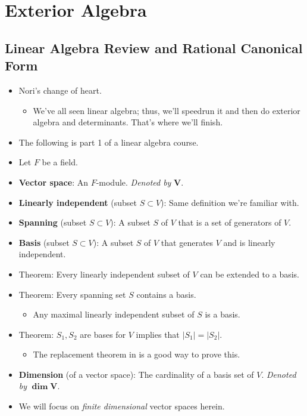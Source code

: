 \documentclass[../notes.tex]{subfiles}
\begin{document}
\chapter{Exterior Algebra}
\section{Linear Algebra Review and Rational Canonical Form}
\begin{itemize}
    \item {}Nori's change of heart.
    \begin{itemize}
        \item We've all seen linear algebra; thus, we'll speedrun it and then do exterior algebra and determinants. That's where we'll finish.
    \end{itemize}
    \item The following is part 1 of a linear algebra course.
    \item Let $F$ be a field.
    \item \textbf{Vector space}: An $F$-module. \emph{Denoted by} $\bm{V}$.
    \item \textbf{Linearly independent} (subset $S\subset V$): Same definition we're familiar with.
    \item \textbf{Spanning} (subset $S\subset V$): A subset $S$ of $V$ that is a set of generators of $V$.
    \item \textbf{Basis} (subset $S\subset V$): A subset $S$ of $V$ that generates $V$ and is linearly independent.
    \item Theorem: Every linearly independent subset of $V$ can be extended to a basis.
    \item Theorem: Every spanning set $S$ contains a basis.
    \begin{itemize}
        \item Any maximal linearly independent subset of $S$ is a basis.
    \end{itemize}
    \item Theorem: $S_1,S_2$ are bases for $V$ implies that $|S_1|=|S_2|$.
    \begin{itemize}
        \item The replacement theorem in \textcite{bib:DummitFoote} is a good way to prove this.
    \end{itemize}
    \item \textbf{Dimension} (of a vector space): The cardinality of a basis set of $V$. \emph{Denoted by} $\bm{\dim V}$.
    \item We will focus on \emph{finite dimensional} vector spaces herein.

\end{itemize}
\end{document}
